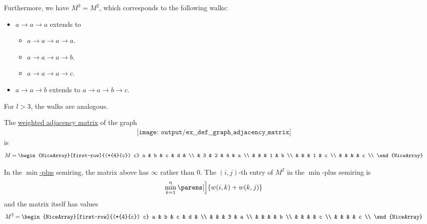 \begin{example}
\begin{thmenum}
    Furthermore, we have \( M^3 = M^2 \), which corresponds to the following walks:
    \begin{itemize}
      \item \( a \to a \to a \) extends to
      \begin{itemize}
        \item \( a \to a \to a \to a \).
        \item \( a \to a \to a \to b \).
        \item \( a \to a \to a \to c \).
      \end{itemize}
      \item \( a \to a \to b \) extends to \( a \to a \to b \to c \).
    \end{itemize}

    For \( l > 3 \), the walks are analogous.

     The \hyperref[def:graph_adjacency_matrix]{weighted adjacency matrix} of the graph
    \begin{equation}\label{eq:ex:def:graph_adjacency_matrix/square/graph}
      \begin{aligned}
        \texttt{[image: output/ex\_\_def\_\_graph\_adjacency\_matrix]}
      \end{aligned}
    \end{equation}
    is
    \begin{equation}\label{eq:ex:def:graph_adjacency_matrix/square/graph/matrix}
      M =
      \begin{NiceArray}[first-row]{(*{4}{c}) c}
        a & b & c & d &   \\
          & 3 & 2 & 4 & a \\
          &   &   & 1 & b \\
          &   &   & 1 & c \\
          &   &   &   & c \\
      \end{NiceArray}
    \end{equation}

    In the \hyperref[def:tropical_semiring]{\( \min \)-plus} semiring, the matrix above has \( \infty \) rather than \( 0 \). The \( (i, j) \)-th entry of \( M^2 \) in the \( \min \)-plus semiring is
    \begin{equation*}
      \min_{k=1}^n \parens[\Big]{ w(i,k) + w(k,j) }
    \end{equation*}
    and the matrix itself has values
    \begin{equation*}
      M^2 =
      \begin{NiceArray}[first-row]{(*{4}{c}) c}
        a & b & c & d &   \\
          &   &   & 3 & a \\
          &   &   &   & b \\
          &   &   &   & c \\
          &   &   &   & c \\
      \end{NiceArray}
    \end{equation*}


\end{thmenum}
\end{example}
